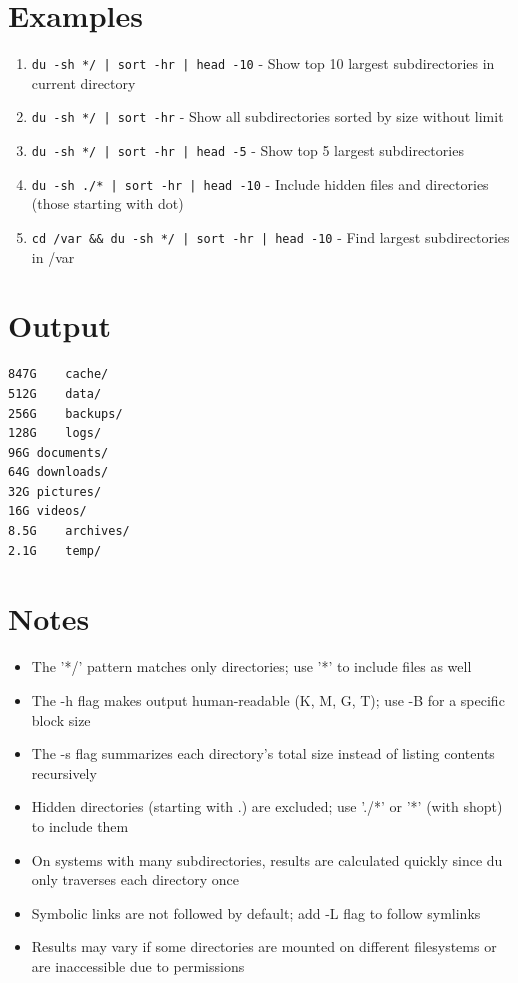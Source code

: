 \documentclass{article}
\begin{document}
\section*{Examples}
\begin{enumerate}
  \item \texttt{du -sh */ | sort -hr | head -10} - Show top 10 largest subdirectories in current directory
  \item \texttt{du -sh */ | sort -hr} - Show all subdirectories sorted by size without limit
  \item \texttt{du -sh */ | sort -hr | head -5} - Show top 5 largest subdirectories
  \item \texttt{du -sh ./* | sort -hr | head -10} - Include hidden files and directories (those starting with dot)
  \item \texttt{cd /var \&\& du -sh */ | sort -hr | head -10} - Find largest subdirectories in /var
\end{enumerate}

\section*{Output}
\begin{lstlisting}
847G	cache/
512G	data/
256G	backups/
128G	logs/
96G	documents/
64G	downloads/
32G	pictures/
16G	videos/
8.5G	archives/
2.1G	temp/
\end{lstlisting}

\section*{Notes}
\begin{itemize}
  \item The '*/' pattern matches only directories; use '*' to include files as well
  \item The -h flag makes output human-readable (K, M, G, T); use -B for a specific block size
  \item The -s flag summarizes each directory's total size instead of listing contents recursively
  \item Hidden directories (starting with .) are excluded; use './*' or '*' (with shopt) to include them
  \item On systems with many subdirectories, results are calculated quickly since du only traverses each directory once
  \item Symbolic links are not followed by default; add -L flag to follow symlinks
  \item Results may vary if some directories are mounted on different filesystems or are inaccessible due to permissions
\end{itemize}
\end{document}
